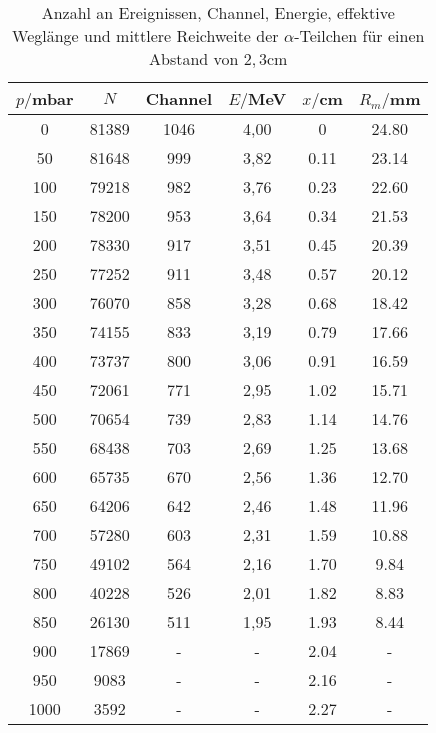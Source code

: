 \begin{table}[H]
  \centering
  \caption{Anzahl an Ereignissen, Channel, Energie, effektive Weglänge und mittlere Reichweite der $\alpha$-Teilchen für einen Abstand von $2,3$cm}
  \label{tab:bla}
  \begin{tabular}{c c c c c c}
    \toprule
    $p/$mbar & $N$ & Channel & $E/$MeV & $x/$cm& $R_m/$mm \\
    \midrule
    0	  & 81389  &1046 &  4,00& 0     & 24.80         \\
    50	& 81648  & 999 &  3,82&  0.11  & 23.14        \\
    100 & 79218  & 982 &  3,76& 0.23  & 22.60        \\
    150 & 78200  & 953 &  3,64& 0.34  & 21.53        \\
    200 & 78330  & 917 &  3,51& 0.45  & 20.39        \\
    250 & 77252  & 911 &  3,48& 0.57  & 20.12        \\
    300 & 76070  & 858 &  3,28& 0.68  & 18.42        \\
    350 & 74155  & 833 &  3,19& 0.79  & 17.66        \\
    400 & 73737  & 800 &  3,06& 0.91  & 16.59        \\
    450 & 72061  & 771 &  2,95& 1.02  & 15.71        \\
    500 & 70654  & 739 &  2,83& 1.14  & 14.76        \\
    550 & 68438  & 703 &  2,69& 1.25  & 13.68        \\
    600 & 65735  & 670 &  2,56& 1.36  & 12.70        \\
    650 & 64206  & 642 &  2,46& 1.48  & 11.96        \\
    700 & 57280  & 603 &  2,31& 1.59  & 10.88        \\
    750 & 49102  & 564 &  2,16& 1.70  & 9.84        \\
    800 & 40228  & 526 &  2,01& 1.82  & 8.83        \\
    850 & 26130  & 511 &  1,95& 1.93  & 8.44        \\
    900 & 17869  &  -  & -    & 2.04  & -        \\
    950 & 9083	 &  -  & -    &  2.16  & -        \\
    1000& 3592   &  -  & -    & 2.27  & -        \\
    \bottomrule
  \end{tabular}
\end{table}





